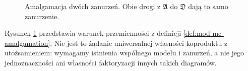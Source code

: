 \begin{figure}[htbp]
\centering
{}
\caption{Amalgamacja dwóch zanurzeń. Obie drogi
z $\mathfrak A$ do $\mathfrak D$ dają to samo zanurzenie.}
\label{fig:mod-mc-amalgamation}
\end{figure}

Rysunek \ref{fig:mod-mc-amalgamation} przedstawia
warunek przemienności z definicji
\ref{def:mod-mc-amalgamation}. Nie jest to żądanie
uniwersalnej własności koproduktu z utożsamieniem:
wymagamy istnienia wspólnego modelu i zanurzeń,
a nie jego jednoznaczności ani własności faktoryzacji
innych takich diagramów.

